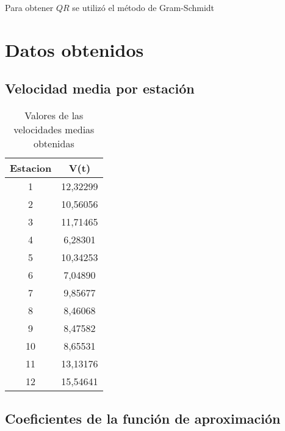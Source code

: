 \documentclass[]{article}
\begin{document}
\par
Para obtener $QR$ se utilizó el método de Gram-Schmidt 

\pagebreak

\section{Datos obtenidos}
\subsection{Velocidad media por estación}

\begin{table}[h!tbp]
    \centering
	\begin{tabular}{|c|c|}
		\hline 
		Estacion & V(t)  \\
		\hline \hline
		1 &12,32299\\ \hline
		2 & 10,56056 \\ \hline
		3 & 11,71465 \\ \hline
		4 & 6,28301 \\ \hline
		5 & 10,34253 \\ \hline
		6 & 7,04890 \\ \hline
		7 & 9,85677 \\ \hline
		8 & 8,46068 \\ \hline
		9 & 8,47582 \\ \hline
		10 & 8,65531 \\ \hline
		11 & 13,13176 \\ \hline
		12 & 15,54641 \\ \hline
	\end{tabular}
	\caption{Valores de las velocidades medias obtenidas}
	\label{table:}
\end{table}

\subsection{Coeficientes de la función de aproximación}
\end{document}
